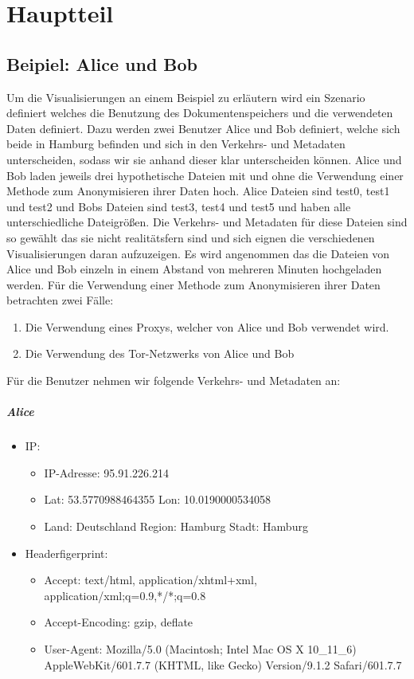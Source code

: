 \documentclass[
    fontsize=12pt,
    headings=small,
    parskip=half,           %
    bibliography=totoc,
    numbers=noenddot,       %
    open=any,               %
    ]{scrreprt}
\begin{document}

\chapter{Hauptteil}

    \section{Beipiel: Alice und Bob}
Um die Visualisierungen an einem Beispiel zu erläutern wird ein Szenario definiert welches die Benutzung des Dokumentenspeichers und die verwendeten Daten definiert.
Dazu werden zwei Benutzer Alice und Bob definiert, welche sich beide in Hamburg befinden und sich in den Verkehrs- und Metadaten unterscheiden, sodass wir sie anhand dieser klar unterscheiden können.
Alice und Bob laden jeweils drei hypothetische Dateien mit und ohne die Verwendung einer Methode zum Anonymisieren ihrer Daten hoch.
Alice Dateien sind test0, test1 und test2 und Bobs Dateien sind test3, test4 und test5 und haben alle unterschiedliche Dateigrößen.
Die Verkehrs- und Metadaten für diese Dateien sind so gewählt das sie nicht realitätsfern sind und sich eignen die verschiedenen Visualisierungen daran aufzuzeigen. 
Es wird angenommen das die Dateien von Alice und Bob einzeln in einem Abstand von mehreren Minuten hochgeladen werden.
Für die Verwendung einer Methode zum Anonymisieren ihrer Daten betrachten zwei Fälle:
\begin{enumerate}
\item Die Verwendung eines Proxys, welcher von Alice und Bob verwendet wird.
\item Die Verwendung des Tor-Netzwerks von Alice und Bob
\end{enumerate}

Für die Benutzer nehmen wir folgende Verkehrs- und Metadaten an: 
\paragraph{Alice}
\begin{itemize}
  \item IP: 
  \begin{itemize}
  \item IP-Adresse: 95.91.226.214
  \item Lat: 53.5770988464355 Lon: 10.0190000534058
  \item Land: Deutschland Region: Hamburg Stadt: Hamburg
  \end{itemize}
  \item Headerfigerprint:  
  \begin{itemize}
  \item Accept: text/html, application/xhtml+xml, application/xml;q=0.9,*/*;q=0.8
  \item Accept-Encoding: gzip, deflate
  \item User-Agent: Mozilla/5.0 (Macintosh; Intel Mac OS X 10\_11\_6) AppleWebKit/601.7.7 (KHTML, like Gecko) Version/9.1.2 Safari/601.7.7
  \end{itemize}
\end{itemize}
\end{document}
